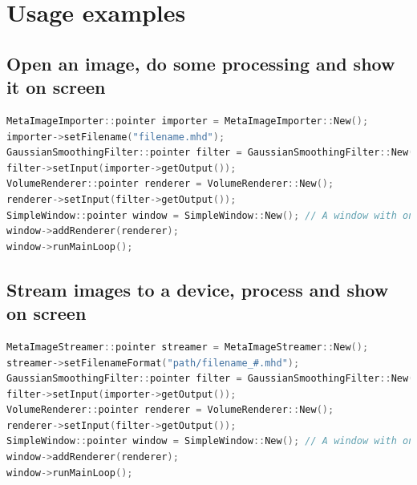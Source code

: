 \documentclass{article}
\begin{document}
\section{Usage examples}

\subsection{Open an image, do some processing and show it on screen}
\begin{lstlisting}[language=C++]
MetaImageImporter::pointer importer = MetaImageImporter::New();
importer->setFilename("filename.mhd");
GaussianSmoothingFilter::pointer filter = GaussianSmoothingFilter::New();
filter->setInput(importer->getOutput());
VolumeRenderer::pointer renderer = VolumeRenderer::New();
renderer->setInput(filter->getOutput());
SimpleWindow::pointer window = SimpleWindow::New(); // A window with only one view
window->addRenderer(renderer);
window->runMainLoop();
\end{lstlisting}

\subsection{Stream images to a device, process and show on screen}
\begin{lstlisting}[language=C++]
MetaImageStreamer::pointer streamer = MetaImageStreamer::New();
streamer->setFilenameFormat("path/filename_#.mhd");
GaussianSmoothingFilter::pointer filter = GaussianSmoothingFilter::New();
filter->setInput(importer->getOutput());
VolumeRenderer::pointer renderer = VolumeRenderer::New();
renderer->setInput(filter->getOutput());
SimpleWindow::pointer window = SimpleWindow::New(); // A window with only one view
window->addRenderer(renderer);
window->runMainLoop();
\end{lstlisting}
\end{document}
